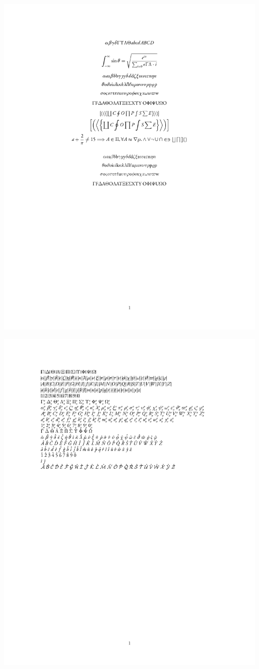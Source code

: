 \documentclass[twocolumn]{article}
\begin{document}
\noindent\includegraphics*{../results/garamond-font}\par
{} \noindent\includegraphics*{../results/garamond-pos}\par
\end{document}
